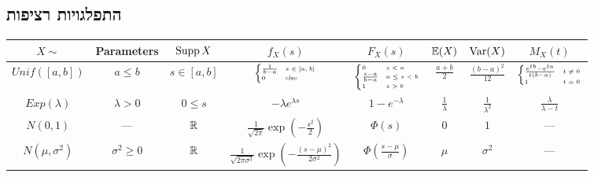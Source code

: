 \subsection{התפלגויות רציפות}
\begin{otherlanguage}{english}
	\begin{center}
		\begin{tabular}{c | c c c c c c c} %
			$X \sim$ & Parameters & $\operatorname{Supp} X$ & $f_X(s)$ & $F_X(s)$ & $\mathbb{E}(X)$ & $\operatorname{Var}(X)$ & $M_X(t)$ \\
			\hline %
			$Unif([a, b])$ & $a \le b$ & $s \in [a, b]$ & $\tiny\begin{cases} \frac{1}{b - a} & s \in [a, b] \\ 0 & \text{else} \end{cases}$ & $\tiny\begin{cases} 0
						   & s < a \\ \frac{s - a}{b - a} & a \le s < b \\ 1 & s > b \end{cases}$
						   & $\frac{a + b}{2}$ & $\frac{{(b - a)}^2}{12}$ & $\tiny\begin{cases} \frac{e^{tb} - e^{ta}}{t(b - a)} & t \ne 0 \\ 1 & t = 0 \end{cases}$ \\
			\hline %
			$Exp(\lambda)$ & $\lambda > 0$ & $0 \le s$ & $-\lambda e^{\lambda s}$ & $1 - e^{-\lambda}$ & $\frac{1}{\lambda}$ & $\frac{1}{\lambda^2}$ & $\frac{\lambda}{\lambda - t}$ \\
			\hline %
			$N(0, 1)$ & --- & $\mathbb{R}$ & $\frac{1}{\sqrt{2 \pi}} \exp(-\frac{s^2}{2})$ & $\Phi(s)$ & $0$ & $1$ & --- \\
			\hline %
			$N(\mu, \sigma^2)$ & $\sigma^2 \ge 0$ & $\mathbb{R}$ & $\frac{1}{\sqrt{2 \pi \sigma^2}} \exp(-\frac{{(s - \mu)}^2}{2 \sigma^2})$ & $\Phi(\frac{s - \mu}{\sigma})$ & $\mu$ & $\sigma^2$ & ---
		\end{tabular}
	\end{center}
\end{otherlanguage}

\listoftheorems[title=הגדרות ומשפטים,ignoreall,show={theorem,definition},swapnumber,onlynamed={proposition}]

